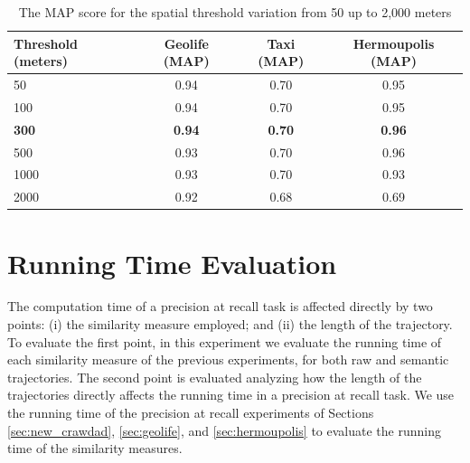 \begin{table}[ht!]
  \scriptsize
  \centering
  \begin{tabular}{|l|c|c|c|}
  \hline
Threshold (meters) & Geolife (MAP) & Taxi (MAP) & Hermoupolis (MAP)\\
  \hline
50 & {0.94} & 0.70 & 0.95\\
100 & {0.94} & 0.70 & 0.95\\
\textbf{300} & \textbf{0.94} & \textbf{0.70} & \textbf{0.96} \\
500 & 0.93 & 0.70 & {0.96}\\
1000 & 0.93 & 0.70 & 0.93\\
2000 & 0.92 & 0.68 & 0.69\\
    \hline
  \end{tabular}
  \caption{The MAP score for the spatial threshold variation from 50 up to 2,000 meters}
  \label{tab:sensibility_spatial_thresholds}
\end{table}


\section{Running Time Evaluation}\label{sec:running_time}

The computation time of a precision at recall task is affected directly by two points: (i) the similarity measure employed; and (ii) the length of the trajectory. To evaluate the first point, in this experiment we evaluate the running time of each similarity measure of the previous experiments, for both raw and semantic trajectories. The second point is evaluated analyzing how the length of the trajectories directly affects the running time in a precision at recall task. We use the running time of the precision at recall experiments of Sections \ref{sec:new_crawdad}, \ref{sec:geolife}, and \ref{sec:hermoupolis} to evaluate the running time of the similarity measures.

